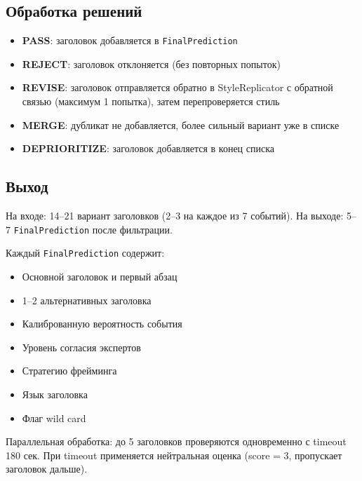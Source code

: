 \subsection{Обработка решений}

\begin{itemize}
  \item \textbf{PASS}: заголовок добавляется в \verb|FinalPrediction|
  \item \textbf{REJECT}: заголовок отклоняется (без повторных попыток)
  \item \textbf{REVISE}: заголовок отправляется обратно в StyleReplicator с обратной связью (максимум 1 попытка), затем перепроверяется стиль
  \item \textbf{MERGE}: дубликат не добавляется, более сильный вариант уже в списке
  \item \textbf{DEPRIORITIZE}: заголовок добавляется в конец списка
\end{itemize}

\subsection{Выход}

На входе: 14--21 вариант заголовков (2--3 на каждое из 7 событий).
На выходе: 5--7 \verb|FinalPrediction| после фильтрации.

Каждый \verb|FinalPrediction| содержит:
\begin{itemize}
  \item Основной заголовок и первый абзац
  \item 1--2 альтернативных заголовка
  \item Калиброванную вероятность события
  \item Уровень согласия экспертов
  \item Стратегию фрейминга
  \item Язык заголовка
  \item Флаг wild card
\end{itemize}

Параллельная обработка: до 5 заголовков проверяются одновременно с timeout 180 сек. При timeout применяется нейтральная оценка (score = 3, пропускает заголовок дальше).

